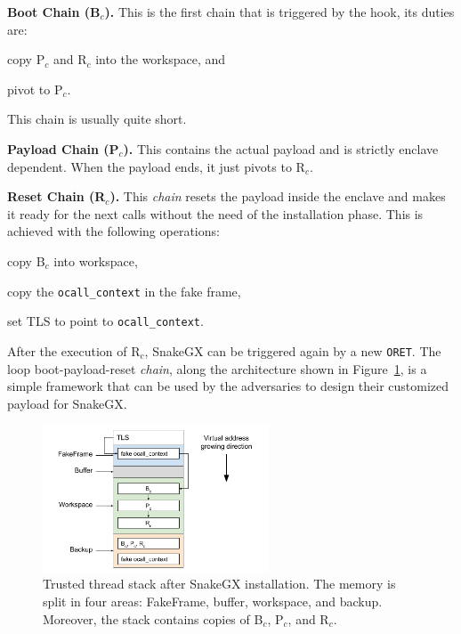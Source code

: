 \textbf{Boot Chain (B$_c$).} This is the first chain that is triggered by 
the hook, its duties are:
\begin{enumerate*}[label=(\roman*)]
	\item copy P$_c$ and R$_c$ into the workspace, and
	\item pivot to P$_c$.
\end{enumerate*} 
This chain is usually quite short.

\textbf{Payload Chain (P$_c$).} This contains the actual payload 
and is strictly enclave dependent. When the payload ends, it just pivots to 
R$_c$.

\textbf{Reset Chain (R$_c$).} 
This \emph{chain} resets the payload inside the enclave and makes it ready for 
the next calls without the need of the installation phase.
This is achieved with the following operations:
\begin{enumerate*}[label=(\roman*)]
	\item copy B$_c$ into workspace,
	\item copy the \texttt{ocall\_context} in the fake frame,
	\item set TLS to point to \texttt{ocall\_context}.
\end{enumerate*}

After the execution of R$_c$, SnakeGX can be triggered again by a new 
\texttt{ORET}.
The loop boot-payload-reset \emph{chain}, along the architecture shown in 
Figure~\ref{fig:t-thread-stack-installed}, is a simple framework that can be 
used by the adversaries to design their customized payload for SnakeGX.

\begin{figure}[t]
	\centering
	\includegraphics[width=0.6\textwidth]{fig_c5/t-thread-stack-installed.pdf}
	\caption[SnakeGX installation layour.]{Trusted thread stack after SnakeGX 
	installation. The memory is split in four areas: FakeFrame, buffer, 
	workspace, and backup. Moreover, the stack contains copies of B$_{c}$, 
	P$_{c}$, and R$_{c}$.}
	\label{fig:t-thread-stack-installed}
\end{figure}

